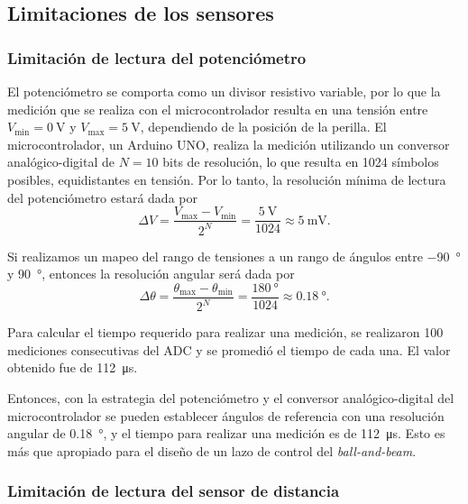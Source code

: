 \subsection{Limitaciones de los sensores}

\subsubsection{Limitación de lectura del potenciómetro}

El potenciómetro se comporta como un divisor resistivo variable, por lo que la medición que se realiza con el microcontrolador resulta en una tensión entre $V_{\min} = \qty{0}{\V}$ y $V_{\max} = \qty{5}{\V}$, dependiendo de la posición de la perilla. El microcontrolador, un Arduino UNO, realiza la medición utilizando un conversor analógico-digital de $N = 10$ bits de resolución, lo que resulta en 1024 símbolos posibles, equidistantes en tensión. Por lo tanto, la resolución mínima de lectura del potenciómetro estará dada por
\begin{equation*}
    \Delta V = \frac{V_{\max} - V_{\min}}{2^N} = \frac{\qty{5}{\V}}{1024} \approx \qty{5}{\mV}.
\end{equation*}

Si realizamos un mapeo del rango de tensiones a un rango de ángulos entre \qty{-90}{\degree} y \qty{90}{\degree}, entonces la resolución angular será dada por
\begin{equation*}
    \Delta \theta = \frac{\theta_{\max} - \theta_{\min}}{2^N} = \frac{\qty{180}{\degree}}{1024} \approx \qty{0.18}{\degree}.
\end{equation*}

Para calcular el tiempo requerido para realizar una medición, se realizaron 100 mediciones consecutivas del ADC y se promedió el tiempo de cada una. El valor obtenido fue de \qty{112}{\us}.

Entonces, con la estrategia del potenciómetro y el conversor analógico-digital del microcontrolador se pueden establecer ángulos de referencia con una resolución angular de \qty{0.18}{\degree}, y el tiempo para realizar una medición es de \qty{112}{\us}. Esto es más que apropiado para el diseño de un lazo de control del \emph{ball-and-beam}.

\subsubsection{Limitación de lectura del sensor de distancia}

